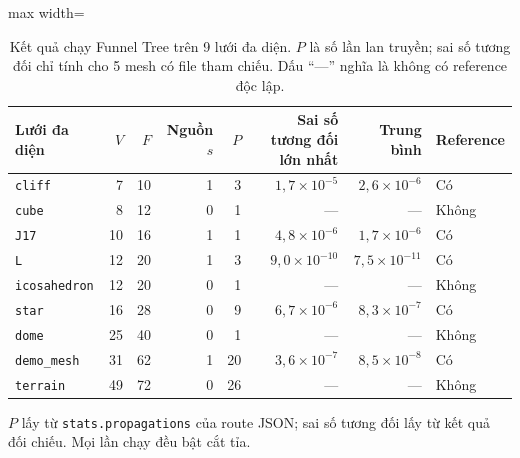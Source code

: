 \begin{table}[!t]
  \caption{Kết quả chạy Funnel Tree trên 9 lưới đa diện. $P$ là số lần lan truyền;
    sai số tương đối chỉ tính cho 5 mesh có file tham chiếu. Dấu ``---'' nghĩa là
    không có reference độc lập.}
  \label{tab:ket-qua-tong-the}
  {\fontsize{7}{8.6}\selectfont
  \begin{adjustbox}{max width=\textwidth}
  \begin{tabular}{@{}lrrrrrrl@{}}
    \toprule
    \textbf{Lưới đa diện} & $V$ & $F$ & \textbf{Nguồn $s$} & $P$
      & \textbf{Sai số tương đối lớn nhất} & \textbf{Trung bình} & \textbf{Reference} \\
    \midrule
    \texttt{cliff}       &  7 & 10  & 1 &  3 & $1{,}7\times10^{-5}$ & $2{,}6\times10^{-6}$ & Có \\
    \texttt{cube}        &  8 & 12  & 0 &  1 & --- & --- & Không \\
    \texttt{J17}         & 10 & 16  & 1 &  1 & $4{,}8\times10^{-6}$ & $1{,}7\times10^{-6}$ & Có \\
    \texttt{L}           & 12 & 20  & 1 &  3 & $9{,}0\times10^{-10}$ & $7{,}5\times10^{-11}$ & Có \\
    \texttt{icosahedron} & 12 & 20  & 0 &  1 & --- & --- & Không \\
    \texttt{star}        & 16 & 28  & 0 &  9 & $6{,}7\times10^{-6}$ & $8{,}3\times10^{-7}$ & Có \\
    \texttt{dome}        & 25 & 40  & 0 &  1 & --- & --- & Không \\
    \texttt{demo\_mesh}  & 31 & 62  & 1 & 20 & $3{,}6\times10^{-7}$ & $8{,}5\times10^{-8}$ & Có \\
    \texttt{terrain}     & 49 & 72  & 0 & 26 & --- & --- & Không \\
    \bottomrule
  \end{tabular}
  \end{adjustbox}}
  \par\smallskip
  {\footnotesize $P$ lấy từ \texttt{stats.propagations} của route JSON; sai số
  tương đối lấy từ kết quả đối chiếu. Mọi lần chạy đều bật cắt tỉa.}
\end{table}

